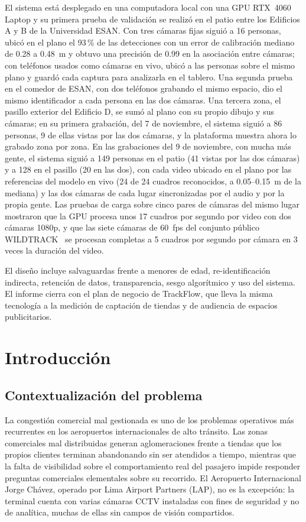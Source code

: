\documentclass[12pt,a4paper]{article}
\begin{document}
El sistema está desplegado en una computadora local con una GPU RTX~4060 Laptop y su
primera prueba de validación se realizó en el patio entre los Edificios A y B
de la Universidad ESAN. Con tres cámaras fijas siguió a 16 personas, ubicó en el plano el
93\,\% de las detecciones con un error de calibración mediano de 0.28 a
0.48~m y obtuvo una precisión de 0.99 en la asociación entre cámaras; con
teléfonos usados como cámaras en vivo, ubicó a las personas sobre el mismo
plano y guardó cada captura para analizarla en el tablero. Una segunda prueba
en el comedor de ESAN, con dos teléfonos grabando el mismo espacio, dio el
mismo identificador a cada persona en las dos cámaras. Una tercera zona, el
pasillo exterior del Edificio D, se sumó al plano con su propio dibujo y sus
cámaras; en su primera grabación, del 7 de noviembre, el sistema siguió a 86
personas, 9 de ellas vistas por las dos cámaras, y la plataforma muestra ahora
lo grabado zona por zona. En las
grabaciones del 9 de noviembre, con mucha más gente, el sistema siguió a 149
personas en el patio (41 vistas por las dos cámaras) y a 128 en el pasillo
(20 en las dos), con cada video ubicado en el plano por las referencias del
modelo en vivo (24 de 24 cuadros reconocidos, a 0.05--0.15~m de la mediana) y las
dos cámaras de cada lugar sincronizadas por el audio y por la propia gente. Las pruebas de carga
sobre cinco pares de cámaras del mismo lugar mostraron que la GPU procesa unos
17 cuadros por segundo por video con dos cámaras 1080p, y que las siete cámaras de 60~fps del conjunto
público WILDTRACK~\cite{chavdarova2018} se procesan
completas a 5 cuadros por segundo por cámara en 3 veces la duración del
video.

El diseño incluye salvaguardas frente a menores de edad, re-identificación
indirecta, retención de datos, transparencia, sesgo algorítmico y uso del
sistema. El informe cierra con el plan de negocio de TrackFlow, que lleva la
misma tecnología a la medición de captación de tiendas y de audiencia de
espacios publicitarios.

\section{Introducción}

\subsection{Contextualización del problema}

La congestión comercial mal gestionada es uno de los problemas operativos
más recurrentes en los aeropuertos internacionales de alto tránsito. Las
zonas comerciales mal distribuidas generan aglomeraciones frente a tiendas
que los propios clientes terminan abandonando sin ser atendidos a tiempo,
mientras que la falta de visibilidad sobre el comportamiento real del
pasajero impide responder preguntas comerciales elementales sobre su
recorrido. El Aeropuerto
Internacional Jorge Chávez, operado por Lima Airport Partners (LAP), no es
la excepción: la terminal cuenta con varias cámaras CCTV instaladas con
fines de seguridad y no de analítica, muchas de ellas sin campos de visión
compartidos.
\end{document}
